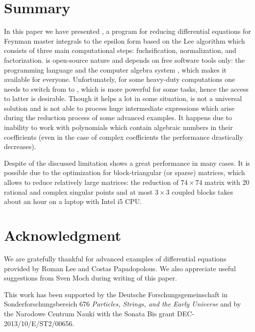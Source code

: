 \documentclass[12pt,a4paper]{article}
\begin{document}
\section{Summary}
\label{sec:4}

In this paper we have presented \fuchsia, a program for reducing differential equations for Feynman master integrals to the epsilon form based on the Lee algorithm \cite{Lee15} which consists of three main computational steps: fuchsification, normalization, and factorization.
\fuchsia is open-source nature and depends on free software tools only: the programming language \python and the computer algebra system \maximasage, which makes it available for everyone.
Unfortunately, for some heavy-duty computations one needs to switch from \maxima to \maple, which is more powerful for some tasks, hence the access to latter is desirable.
Though it helps a lot in some situation, \maple is not a universal solution and is not able to process huge intermediate expressions which arise during the reduction process of some advanced examples.
It happens due to inability to work with polynomials which contain algebraic numbers in their coefficients (even in the case of complex coefficients the performance drastically decreases).

Despite of the discussed limitation \fuchsia shows a great performance in many cases.
It is possible due to the optimization for block-triangular (or sparse) matrices, which allows to reduce relatively large matrices: the reduction of ${74\times74}$ matrix with 20 rational and complex singular points and at most $3\times3$ coupled blocks takes about an hour on a laptop with Intel i5 CPU.

\section*{Acknowledgment}

We are gratefully thankful for advanced examples of differential equations provided by Roman Lee and Costas Papadopolous.
We also appreciate useful suggestions from Sven Moch during writing of this paper.

This work has been supported by the Deutsche Forschungsgemeinschaft in Sonderforschungs\-be\-reich 676 {\it Particles, Strings, and the Early Universe} and by the Narodowe Centrum Nauki with the Sonata Bis grant DEC-2013/10/E/ST2/00656.





\end{document}
